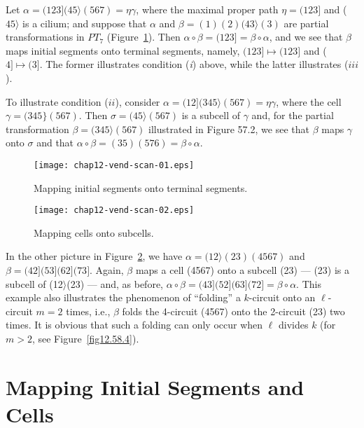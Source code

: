 \documentclass{surv-l}
\numberwithin{equation}{section}
\numberwithin{table}{section}
\numberwithin{figure}{section}
\theoremstyle{definition}
\begin{document}
Let $\alpha=(123](45\rangle(567)=\eta\gamma$, where the maximal
proper path $\eta=(123]$ and ($45\rangle$ is a cilium; and suppose
that $\alpha$ and $\beta=(1)(2)(43\rangle(3)$ are partial
transformations in $PT_{7}$ (Figure~\ref{fig12.57.1}). Then
$\alpha \circ\beta=(123]=\beta \circ\alpha$, and we see that
$\beta$ maps initial segments onto terminal segments, namely,
$(123]\mapsto(123]$ and ($4]\mapsto(3]$. The former illustrates
condition (\emph{i}) above, while the latter illustrates ($iii$).

To illustrate condition ($ii$), consider
$\alpha=(12](345\rangle(567)=\eta\gamma$, where the cell
$\gamma=(345\}(567)$. Then $\sigma=(45\rangle(567)$ is a subcell
of $\gamma$ and, for the partial transformation
$\beta=(345\rangle(567)$ illustrated in Figure 57.2, we see that
$\beta$ maps $\gamma$ onto $\sigma$ and that $\alpha
\circ\beta=(35)(576)=\beta \circ\alpha$.

\begin{figure}[!h]
\texttt{[image: chap12-vend-scan-01.eps]}
\caption{Mapping initial segments onto terminal segments.\label{fig12.57.1}}
\end{figure}

\begin{figure}[!h]
\texttt{[image: chap12-vend-scan-02.eps]}
\caption{Mapping cells onto subcells.\label{fig12.57.2}}
\end{figure}

In the other picture in Figure~\ref{fig12.57.2}, we have
$\alpha=(12\rangle(23)(4567)$ and $\beta= (42](53](62](73]$.
Again, $\beta$ maps a cell (4567) onto a subcell (23) --- (23) is
a subcell of (12$\rangle$(23) --- and, as before, $\alpha
\circ\beta=(43](52](63](72]=\beta \circ\alpha$. This example also
illustrates the phenomenon of ``folding'' a $k$-circuit onto an
$\ell$-circuit $m=2$ times, i.e., $\beta$ folds the 4-circuit
(4567) onto the 2-circuit (23) two times. It is obvious that such
a folding can only occur when $\ell$ divides $k$ (for $m>2$, see
Figure~\ref{fig12.58.4}).

\section{Mapping Initial Segments and Cells}\label{sec12.58}
\end{document}

